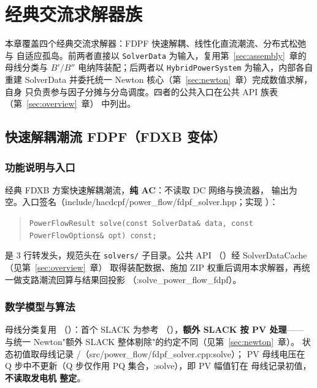 \section{经典交流求解器族}\label{sec:classic}

本章覆盖四个经典交流求解器：FDPF 快速解耦、线性化直流潮流、分布式松弛与
自适应孤岛。前两者直接以 \texttt{SolverData} 为输入，复用第~\ref{sec:assembly}~章的
母线分类与 $B'/B''$ 电纳阵装配；后两者以 \texttt{HybridPowerSystem} 为输入，内部各自
重建 SolverData 并委托统一 Newton 核心（第~\ref{sec:newton}~章）完成数值求解，自身
只负责参与因子分摊与分岛调度。四者的公共入口在公共 API 族表（第~\ref{sec:overview}~章）
中列出。

\subsection{快速解耦潮流 FDPF（FDXB 变体）}


\subsubsection*{功能说明与入口}
经典 FDXB 方案快速解耦潮流，\textbf{纯 AC}：不读取 DC 网络与换流器，
 输出为空。入口签名（include/hacdcpf/power\_flow/fdpf\_solver.hpp；实现
）：
\begin{quote}\footnotesize
\texttt{PowerFlowResult solve(const SolverData\& data, const PowerFlowOptions\& opt) const;}
\end{quote}
 是 3 行转发头，规范头在
\texttt{solvers/} 子目录。公共 API 
（）经 SolverDataCache（见第~\ref{sec:overview}~章）
取得装配数据、施加 ZIP 权重后调用本求解器，再统一做支路潮流回算与结果回投影
（:solve\_power\_flow\_fdpf）。

\subsubsection*{数学模型与算法}
母线分类复用 
（）：首个 SLACK 为参考
（），\textbf{额外 SLACK 按 PV 处理}——
与统一 Newton"额外 SLACK 整体剔除"的约定不同（见第~\ref{sec:newton}~章）。
状态初值取母线记录 /（src/power\_flow/fdpf\_solver.cpp:solve）；
PV 母线电压在 Q 步中不更新（Q 步仅作用 PQ 集合，:solve），即 PV 幅值钉在
母线记录初值，\textbf{不读取发电机  整定}。

